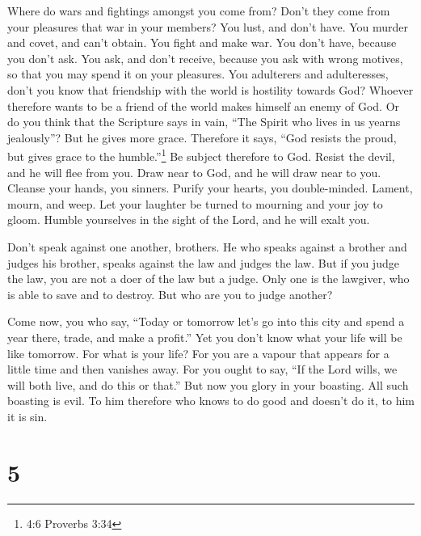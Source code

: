  Where do wars and fightings amongst you come from? Don't
they come from your pleasures that war in your members?  You
lust, and don't have. You murder and covet, and can't obtain. You fight
and make war. You don't have, because you don't ask.  You
ask, and don't receive, because you ask with wrong motives, so that you
may spend it on your pleasures.  You adulterers and
adulteresses, don't you know that friendship with the world is hostility
towards God? Whoever therefore wants to be a friend of the world makes
himself an enemy of God.  Or do you think that the Scripture
says in vain, ``The Spirit who lives in us yearns jealously''?
 But he gives more grace. Therefore it says, ``God resists
the proud, but gives grace to the humble.''\footnote{4:6 Proverbs 3:34}
 Be subject therefore to God. Resist the devil, and he will
flee from you.  Draw near to God, and he will draw near to
you. Cleanse your hands, you sinners. Purify your hearts, you
double-minded.  Lament, mourn, and weep. Let your laughter
be turned to mourning and your joy to gloom.  Humble
yourselves in the sight of the Lord, and he will exalt you.

 Don't speak against one another, brothers. He who speaks
against a brother and judges his brother, speaks against the law and
judges the law. But if you judge the law, you are not a doer of the law
but a judge.  Only one is the lawgiver, who is able to save
and to destroy. But who are you to judge another?

 Come now, you who say, ``Today or tomorrow let's go into
this city and spend a year there, trade, and make a profit.''
 Yet you don't know what your life will be like tomorrow.
For what is your life? For you are a vapour that appears for a little
time and then vanishes away.  For you ought to say, ``If
the Lord wills, we will both live, and do this or that.'' 
But now you glory in your boasting. All such boasting is evil.
 To him therefore who knows to do good and doesn't do it,
to him it is sin.

\hypertarget{section-4}{%
\section{5}\label{section-4}}

